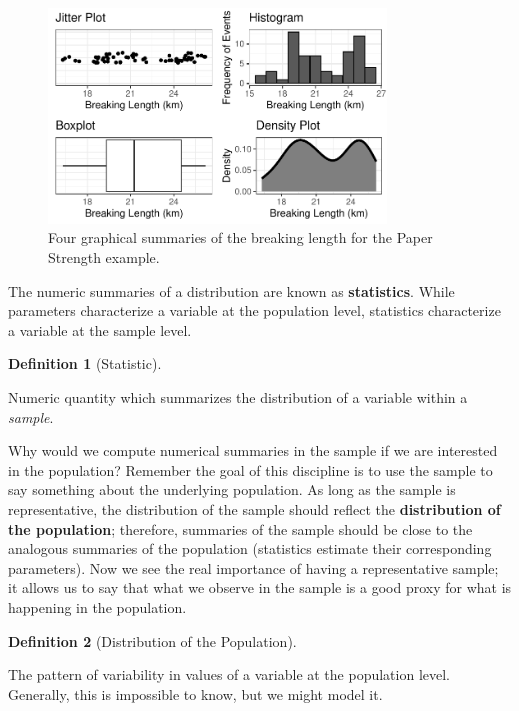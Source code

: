 \documentclass[
  letterpaper,
  DIV=11,
  numbers=noendperiod]{scrreprt}
\theoremstyle{definition}
\theoremstyle{definition}
\newtheorem{definition}{Definition}[chapter]
\theoremstyle{plain}
\theoremstyle{remark}
\begin{document}
\begin{figure}

{\centering \includegraphics[width=0.8\textwidth,height=\textheight]{./images/fig-summaries-univariate-1.pdf}

}

\caption{\label{fig-summaries-univariate}Four graphical summaries of the
breaking length for the Paper Strength example.}

\end{figure}

The numeric summaries of a distribution are known as
\textbf{statistics}. While parameters characterize a variable at the
population level, statistics characterize a variable at the sample
level.

\begin{definition}[Statistic]\protect\hypertarget{def-statistic}{}\label{def-statistic}

Numeric quantity which summarizes the distribution of a variable within
a \emph{sample}.

\end{definition}

Why would we compute numerical summaries in the sample if we are
interested in the population? Remember the goal of this discipline is to
use the sample to say something about the underlying population. As long
as the sample is representative, the distribution of the sample should
reflect the \textbf{distribution of the population}; therefore,
summaries of the sample should be close to the analogous summaries of
the population (statistics estimate their corresponding parameters). Now
we see the real importance of having a representative sample; it allows
us to say that what we observe in the sample is a good proxy for what is
happening in the population.

\begin{definition}[Distribution of the
Population]\protect\hypertarget{def-distribution-population}{}\label{def-distribution-population}

The pattern of variability in values of a variable at the population
level. Generally, this is impossible to know, but we might model it.

\end{definition}
\end{document}

